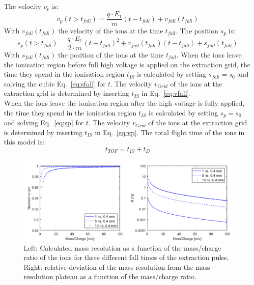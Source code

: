 	The velocity $v_{p}$ is:
	\begin{equation}
		v_{p}(t > t_{fall}) = \frac{q\cdot E_1}{m}(t-t_{fall}) + v_{fall}(t_{fall})
		\label{eq:vp}
	\end{equation}
	With $v_{fall}(t_{fall})$ the velocity of the ions at the time $t_{fall}$. The position $s_{p}$ is:
	\begin{equation}
		s_{p}(t > t_{fall}) = \frac{q\cdot E_1}{2\cdot m}(t-t_{fall})^2 + v_{fall}(t_{fall})(t-t_{fall}) + s_{fall}(t_{fall})
		\label{eq:sp}
	\end{equation}
	With $s_{fall}(t_{fall})$ the position of the ions at the time $t_{fall}$. When the ions leave the ionisation region before full high voltage is applied on the extraction grid, the time they spend in the ionisation region $t_{IS}$ is calculated by setting $s_{fall}=s_0$ and solving the cubic Eq.~\eqref{eq:sfall} for $t$. The velocity $v_{Grid}$ of the ions at the extraction grid is determined by inserting $t_{IS}$ in Eq.~\eqref{eq:vfall}.\\
	When the ions leave the ionisation region after the high voltage is fully applied, the time they spend in the ionisation region $t_{IS}$ is calculated by setting $s_{p}=s_0$ and solving Eq.~\eqref{eq:sp} for $t$. The velocity $v_{Grid}$ of the ions at the extraction grid is determined by inserting $t_{IS}$ in Eq.~\eqref{eq:vp}. The total flight time of the ions in this model is:
	\begin{equation}
		t_{TOF} = t_{IS} + t_D
	\end{equation}
	\begin{figure}[H] %
		\centering
		\includegraphics[width=\textwidth]{Bilder/PulseSimMassRes_Norm.png}
		\caption{Left: Calculated mass resolution as a function of the mass/charge ratio of the ions for three different fall times of the extraction pulse. Right: relative deviation of the mass resolution from the mass resolution plateau as a function of the mass/charge ratio.}
		\label{fig:Simtfall}
	\end{figure}
